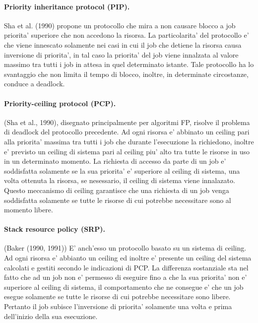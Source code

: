\paragraph{Priority inheritance protocol (PIP).} Sha et al. (1990) propone un protocollo che mira a non causare blocco a job priorita' superiore che non accedono la risorsa. La particolarita' del protocollo e' che viene innescato solamente nei casi in cui il job che detiene la risorsa causa inversione di priorita', in tal caso la priorita' del job viene innalzata al valore massimo tra tutti i job in attesa in quel determinato istante. Tale protocollo ha lo svantaggio che non limita il tempo di blocco, inoltre, in determinate circostanze, conduce a deadlock.\\

\paragraph{Priority-ceiling protocol (PCP).} (Sha et al., 1990), disegnato principalmente per algoritmi FP, risolve il problema di deadlock del protocollo precedente. Ad ogni risorsa e' abbinato un ceiling pari alla priorita' massima tra tutti i job che durante l'esecuzione la richiedono, inoltre e' previsto un ceiling di sistema pari al ceiling piu' alto tra tutte le risorse in uso in un determinato momento. La richiesta di accesso da parte di un job e' soddisfatta solamente se la sua priorita' e' superiore al ceiling di sistema, una volta ottenuta la risorsa, se nesessario, il ceiling di sistema viene innalazato. Questo meccanismo di ceiling garantisce che una richiesta di un job venga soddisfatta solamente se tutte le risorse di cui potrebbe necessitare sono al momento libere.\\

\paragraph{Stack resource policy (SRP).} (Baker (1990, 1991)) E' anch'esso un protocollo basato su un sistema di ceiling. Ad ogni risorsa e' abbianto un ceiling ed inoltre e' presente un ceiling del sistema calcolati e gestiti secondo le indicazioni di PCP. La differenza sostanziale sta nel fatto che ad un job non e' permesso di eseguire fino a che la sua priorita' non e' superiore al ceiling di sistema, il comportamento che ne consegue e' che un job esegue solamente se tutte le risorse di cui potrebbe necessitare sono libere. Pertanto il job subisce l'inversione di priorita' solamente una volta e prima dell'inizio della sua esecuzione.\\


